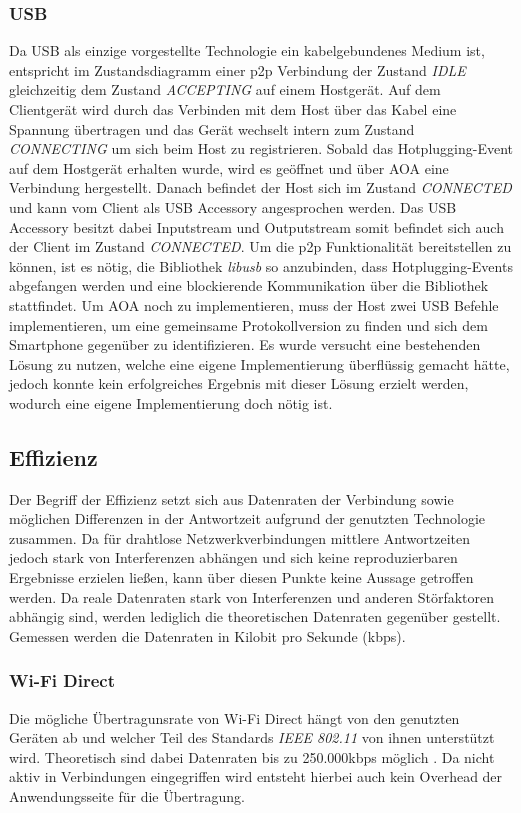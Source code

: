      \subsubsection{USB} Da USB als einzige vorgestellte Technologie ein kabelgebundenes Medium ist, \linebreak entspricht im Zustandsdiagramm einer p2p Verbindung der Zustand {\it IDLE} gleichzeitig dem Zustand {\it ACCEPTING} auf einem Hostgerät. Auf dem Clientgerät wird durch das Verbinden mit dem Host über das Kabel eine Spannung übertragen und das Gerät wechselt intern zum Zustand {\it CONNECTING} um sich beim Host zu registrieren. Sobald das Hotplugging-Event auf dem Hostgerät erhalten wurde, wird es geöffnet und über AOA eine Verbindung hergestellt. Danach befindet der Host sich im Zustand {\it CONNECTED} und kann vom Client als USB Accessory angesprochen werden. Das USB Accessory besitzt dabei Inputstream und Outputstream somit befindet sich auch der Client im Zustand {\it CONNECTED}.
     Um die p2p Funktionalität bereitstellen zu können, ist es nötig, die Bibliothek {\it libusb} so anzubinden, dass Hotplugging-Events abgefangen werden und eine blockierende Kommunikation über die Bibliothek stattfindet. Um AOA noch zu implementieren, muss der Host zwei USB Befehle implementieren, um eine gemeinsame Protokollversion zu finden und sich dem Smartphone gegenüber zu identifizieren. Es wurde versucht eine bestehenden Lösung zu nutzen, welche eine eigene Implementierung überflüssig gemacht hätte, jedoch konnte kein erfolgreiches Ergebnis mit dieser Lösung erzielt werden, wodurch eine eigene Implementierung doch nötig ist.
		
		\subsection{Effizienz}
	   Der Begriff der Effizienz setzt sich aus Datenraten der Verbindung sowie möglichen Differenzen in der Antwortzeit aufgrund der genutzten Technologie zusammen. Da für drahtlose Netzwerkverbindungen mittlere Antwortzeiten jedoch stark von Interferenzen abhängen und sich keine reproduzierbaren Ergebnisse erzielen ließen, kann über diesen Punkte keine Aussage getroffen werden. Da reale Datenraten stark von Interferenzen und anderen Störfaktoren abhängig sind, werden lediglich die theoretischen Datenraten gegenüber gestellt. Gemessen werden die Datenraten in Kilobit pro Sekunde (kbps).

		\subsubsection{Wi-Fi Direct} Die mögliche Übertragunsrate von Wi-Fi Direct hängt von den genutzten Geräten ab und welcher Teil des Standards {\it IEEE 802.11} von ihnen unterstützt wird. Theoretisch sind dabei Datenraten bis zu 250.000kbps möglich \cite{wifiRate}. Da nicht aktiv in Verbindungen eingegriffen wird entsteht hierbei auch kein Overhead der Anwendungsseite für die Übertragung.
		
